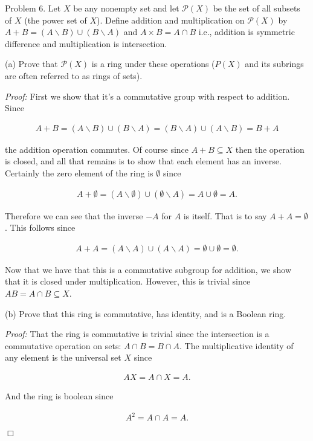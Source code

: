 \documentclass{article}
\begin{document}
  {\Large \color{Sepia} Problem 6.  Let $X$ be any nonempty set and let $\mathcal P(X)$ be the set of all subsets of $X$ (the power set of $X$).  Define addition and multiplication on $\mathcal P(X)$ by $A+B= (A\smallsetminus B)\cup(B\smallsetminus A)$ and $A\times B=A\cap B$ i.e., addition is symmetric difference and multiplication is intersection.

  (a)  Prove that $\mathcal P(X)$ is a ring under these operations ($P(X)$ and its subrings are often referred to as rings of sets).}

  {\it Proof:} First we show that it's a commutative group with respect to addition.  Since

  \begin{align*}
    A+B = (A\smallsetminus B)\cup (B\smallsetminus A) = (B\smallsetminus A)\cup (A\smallsetminus B) = B+A
  \end{align*}

  the addition operation commutes.  Of course since $A+B \subseteq X$ then the operation is closed, and all that remains is to show that each element has an inverse.  Certainly the zero element of the ring is $\emptyset$ since

  \begin{align*}
    A+\emptyset = (A\smallsetminus\emptyset)\cup(\emptyset\smallsetminus A) = A\cup \emptyset = A.
  \end{align*}

  Therefore we can see that the inverse $-A$ for $A$ is itself.  That is to say $A+A=\emptyset$.  This follows since

  \begin{align*}
    A+A = (A\smallsetminus A) \cup (A\smallsetminus A) = \emptyset \cup \emptyset = \emptyset.
  \end{align*}

  Now that we have that this is a commutative subgroup for addition, we show that it is closed under multiplication.  However, this is trivial since $AB = A\cap B \subseteq X$.

  \vspace{1cm}

  {\Large \color{Sepia} (b)  Prove that this ring is commutative, has identity, and is a Boolean ring.}

  {\it Proof:}  That the ring is commutative is trivial since the intersection is a commutative operation on sets: $A\cap B = B\cap A$.  The multiplicative identity of any element is the universal set $X$ since

  \begin{align*}
    AX = A\cap X = A.
  \end{align*}

  And the ring is boolean since

  \begin{align*}
    A^2 = A\cap A = A.
  \end{align*}

  $\Box$
\end{document}
